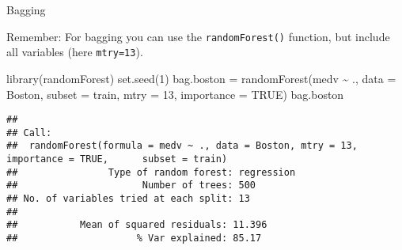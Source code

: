 \documentclass[
  10pt,
  ignorenonframetext,
]{beamer}
\newenvironment{Shaded}{\begin{snugshade}}{\end{snugshade}}
\newcommand{\AttributeTok}[1]{\textcolor[rgb]{0.77,0.63,0.00}{#1}}
\newcommand{\ConstantTok}[1]{\textcolor[rgb]{0.00,0.00,0.00}{#1}}
\newcommand{\DecValTok}[1]{\textcolor[rgb]{0.00,0.00,0.81}{#1}}
\newcommand{\FunctionTok}[1]{\textcolor[rgb]{0.00,0.00,0.00}{#1}}
\newcommand{\NormalTok}[1]{#1}
\newcommand{\OtherTok}[1]{\textcolor[rgb]{0.56,0.35,0.01}{#1}}
\newcommand{\SpecialCharTok}[1]{\textcolor[rgb]{0.00,0.00,0.00}{#1}}
\begin{document}
\begin{frame}[fragile]
\begin{block}{Bagging}
\protect\hypertarget{bagging-1}{}
\(~\)

\small

Remember: For bagging you can use the \texttt{randomForest()} function,
but include all variables (here \texttt{mtry=13}).

\vspace{2mm}

\scriptsize

\begin{Shaded}
\begin{Highlighting}[]
\FunctionTok{library}\NormalTok{(randomForest)}
\FunctionTok{set.seed}\NormalTok{(}\DecValTok{1}\NormalTok{)}
\NormalTok{bag.boston }\OtherTok{=} \FunctionTok{randomForest}\NormalTok{(medv }\SpecialCharTok{\textasciitilde{}}\NormalTok{ ., }\AttributeTok{data =}\NormalTok{ Boston, }\AttributeTok{subset =}\NormalTok{ train, }\AttributeTok{mtry =} \DecValTok{13}\NormalTok{,}
    \AttributeTok{importance =} \ConstantTok{TRUE}\NormalTok{)}
\NormalTok{bag.boston}
\end{Highlighting}
\end{Shaded}

\begin{verbatim}
## 
## Call:
##  randomForest(formula = medv ~ ., data = Boston, mtry = 13, importance = TRUE,      subset = train) 
##                Type of random forest: regression
##                      Number of trees: 500
## No. of variables tried at each split: 13
## 
##           Mean of squared residuals: 11.396
##                     % Var explained: 85.17
\end{verbatim}
\end{block}
\end{frame}
\end{document}
